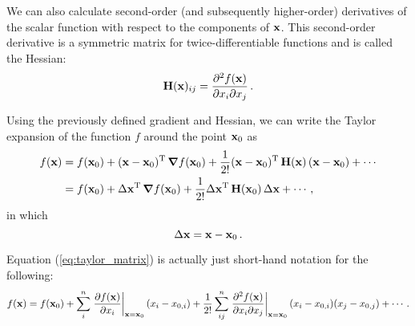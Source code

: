         We can also calculate second-order (and subsequently higher-order) derivatives of the scalar function with respect to the components of $\vb{x}$. This second-order derivative is a symmetric matrix for twice-differentiable functions and is called the Hessian:
        \begin{equation}
            \vb{H}(\vb{x})_{ij} = \pdv{f(\vb{x})}{x_i}{x_j} \thinspace .
        \end{equation}

        Using the previously defined gradient and Hessian, we can write the Taylor expansion of the function $f$ around the point $\vb{x}_0$ as
        \begin{align}
            f(\vb{x}) &= f(\vb{x}_0) + (\vb{x} - \vb{x}_0)^\text{T} \thinspace \grad{f(\vb{x}_0)} + \frac{1}{2!} (\vb{x} - \vb{x}_0)^\text{T} \thinspace \vb{H}(\vb{x}) \thinspace (\vb{x} - \vb{x}_0) + \cdots \label{eq:taylor_matrix} \\
            &= f(\vb{x}_0) + \Delta \vb{x}^\text{T} \thinspace \grad{f(\vb{x}_0)} + \frac{1}{2!} \Delta \vb{x}^\text{T} \thinspace \vb{H}(\vb{x}_0) \thinspace \Delta \vb{x} + \cdots \thinspace ,
        \end{align}
        in which
        \begin{equation}
            \Delta \vb{x} = \vb{x} - \vb{x}_0 \thinspace .
        \end{equation}

        Equation (\ref{eq:taylor_matrix}) is actually just short-hand notation for the following:
        \begin{equation}
            f(\vb{x}) = f(\vb{x}_0) + \sum_i^n \eval{\pdv{f(\vb{x})}{x_i}}_{\vb{x}=\vb{x}_0} (x_i - x_{0,i}) + \frac{1}{2!} \sum_{ij}^n \eval{\pdv{f(\vb{x})}{x_i}{x_j}}_{\vb{x}=\vb{x}_0} (x_i - x_{0,i}) (x_j - x_{0,j}) + \cdots \thinspace .
        \end{equation}

